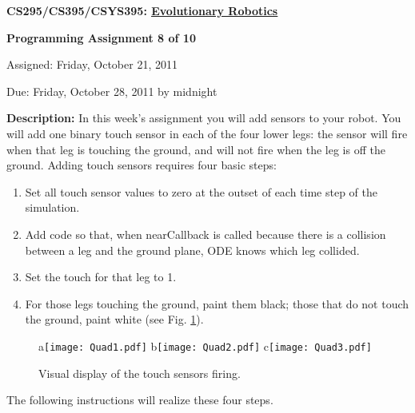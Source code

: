 \documentclass[12pt]{article}
\begin{document}
\centerline{\bf \Large CS295/CS395/CSYS395: \href{CS295_395_Syllabus.pdf}{\underline{Evolutionary Robotics}}}

\vspace{0.5cm}

\centerline{\bf \large Programming Assignment 8 of 10}

\vspace{0.5cm}

\centerline{\large Assigned: Friday, October 21, 2011}

\vspace{0.5cm}

\centerline{\large Due: Friday, October 28, 2011 by midnight}

\vspace{0.5cm}

\noindent \textbf{Description:} In this week's assignment you will add sensors to your robot. You will add one binary touch sensor in each of the four lower legs: the sensor will fire when that leg is touching the ground, and will not fire when the leg is off the ground. Adding touch sensors requires four basic steps:

\begin{enumerate}

\item Set all touch sensor values to zero at the outset of each time step of the simulation.

\item Add code so that, when nearCallback is called because there is a collision between a leg and the ground plane, ODE knows which leg collided.

\item Set the touch for that leg to 1.

\item For those legs touching the ground, paint them black; those that do not touch the ground, paint white (see Fig. \ref{Fig1}).
\end{enumerate}

\begin{figure}
\centerline{
a\texttt{[image: Quad1.pdf]}
b\texttt{[image: Quad2.pdf]}
c\texttt{[image: Quad3.pdf]}}
\caption{Visual display of the touch sensors firing.}
\label{Fig1}
\end{figure}

The following instructions will realize these four steps.
\end{document}
